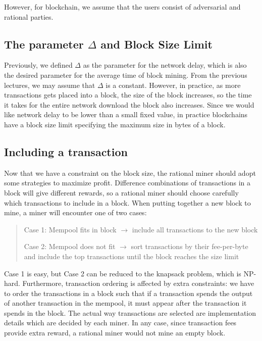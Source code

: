 However, for blockchain, we assume that the users consist of adversarial and rational parties.

\subsection{The parameter $\Delta$ and Block Size Limit}
Previously, we defined $\Delta$ as the parameter for the network delay, which is also the desired parameter for the average time of block mining. From the previous lectures, we may assume that $\Delta$ is a constant. However, in practice, as more transactions gets placed into a block, the size of the block increases, so the time it takes for the entire network download the block also increases. Since we would like network delay to be lower than a small fixed value, in practice blockchains have a block size limit specifying the maximum size in bytes of a block.

\subsection{Including a transaction}
Now that we have a constraint on the block size, the rational miner should adopt some strategies to maximize profit. Difference combinations of transactions in a block will give different rewards, so a rational miner should choose carefully which transactions to include in a block. When putting together a new block to mine, a miner will encounter one of two cases:

\begin{quote}
    Case 1: Mempool fits in block $\longrightarrow$ include all transactions to the new block

    Case 2: Mempool does not fit $\longrightarrow$ sort transactions by their fee-per-byte and include the top transactions until the block reaches the size limit
\end{quote}

Case 1 is easy, but Case 2 can be reduced to the knapsack problem, which is NP-hard. Furthermore, transaction ordering is affected by extra constraints: we have to order the transactions in a block such that if a transaction spends the output of another transaction in the mempool, it must appear after the transaction it spends in the block. The actual way transactions are selected are implementation details which are decided by each miner. In any case, since transaction fees provide extra reward, a rational miner would not mine an empty block.


